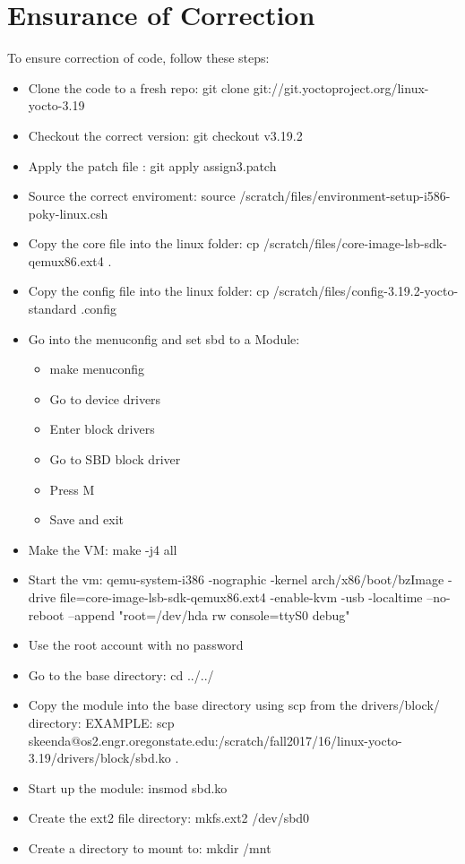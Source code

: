 \documentclass[10pt,drafclsnofoot,onecolumn]{article}
\begin{document}
\section{Ensurance of Correction}
To ensure correction of code, follow these steps:

\begin{itemize}
\item Clone the code to a fresh repo: git clone git://git.yoctoproject.org/linux-yocto-3.19
\item Checkout the correct version: git checkout v3.19.2
\item Apply the patch file : git apply assign3.patch
\item Source the correct enviroment: source /scratch/files/environment-setup-i586-poky-linux.csh
\item Copy the core file into the linux folder: cp /scratch/files/core-image-lsb-sdk-qemux86.ext4 .
\item Copy the config file into the linux folder: cp /scratch/files/config-3.19.2-yocto-standard .config
\item Go into the menuconfig and set sbd to a Module:
	\begin{itemize}
	\item make menuconfig
	\item Go to device drivers
	\item Enter block drivers
	\item Go to SBD block driver
	\item Press M
	\item Save and exit
	\end{itemize}
\item Make the VM: make -j4 all
\item Start the vm: qemu-system-i386 -nographic -kernel arch/x86/boot/bzImage -drive file=core-image-lsb-sdk-qemux86.ext4 -enable-kvm -usb -localtime --no-reboot --append "root=/dev/hda rw console=ttyS0 debug"
\item Use the root account with no password
\item Go to the base directory: cd ../../
\item Copy the module into the base directory using scp from the drivers/block/ directory: EXAMPLE: scp skeenda@os2.engr.oregonstate.edu:/scratch/fall2017/16/linux-yocto-3.19/drivers/block/sbd.ko .
\item Start up the module: insmod sbd.ko
\item Create the ext2 file directory: mkfs.ext2 /dev/sbd0
\item Create a directory to mount to: mkdir /mnt

\end{itemize}
\end{document}
